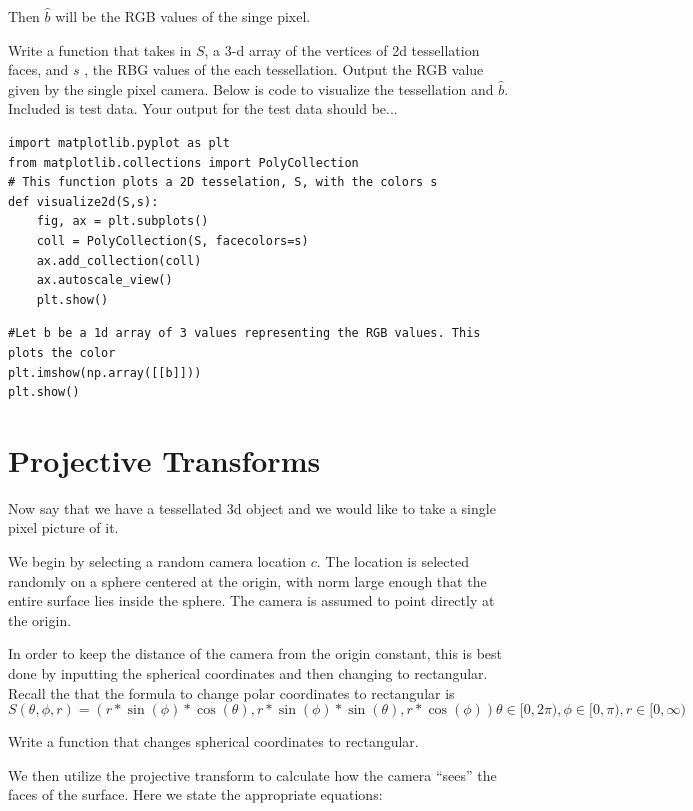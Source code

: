 Then $\hat{b}$ will be the RGB values of the singe pixel.

\begin{problem}
Write a function that takes in $S$, a 3-d array of the vertices of 2d tessellation faces, and $s$ , the RBG values of the each tessellation. Output the RGB value given by the single pixel camera. Below is code to visualize the tessellation and $\hat{b}$.  Included is test data. Your output for the test data should be...
\end{problem}

\begin{lstlisting}
import matplotlib.pyplot as plt
from matplotlib.collections import PolyCollection
# This function plots a 2D tesselation, S, with the colors s 
def visualize2d(S,s):
    fig, ax = plt.subplots()
    coll = PolyCollection(S, facecolors=s)
    ax.add_collection(coll)
    ax.autoscale_view()
    plt.show()
\end{lstlisting}
\begin{lstlisting}
#Let b be a 1d array of 3 values representing the RGB values. This plots the color
plt.imshow(np.array([[b]]))
plt.show()
\end{lstlisting}

\section*{Projective Transforms}
Now say that we have a tessellated 3d object and we would like to take a single pixel picture of it.

We begin by selecting a random camera location $c$. The location is selected randomly on a sphere centered at the origin, with norm large enough that the entire surface lies inside the sphere. The camera is assumed to point directly at the origin.

In order to keep the distance of the camera from the origin constant, this is best done by inputting the spherical coordinates and then changing to rectangular. Recall the that the formula to change polar coordinates to rectangular is 
\[
S(\theta,\phi,r)=(r*\sin(\phi)*\cos(\theta),r*\sin(\phi)*\sin(\theta),r*\cos(\phi))
\theta \in [0,2\pi),\phi \in [0,\pi), r \in [0,\infty)
\]
\begin{problem}
Write a function that changes spherical coordinates to rectangular.
\end{problem}

We then utilize the projective transform to calculate how the camera ``sees'' the faces of the surface. Here we state the appropriate equations:

